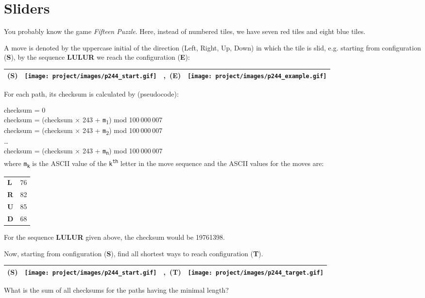 \section[Problem \#244: Sliders]{Sliders}
\label{sec:problem_244}

You probably know the game \emph{Fifteen Puzzle}. Here, instead of
numbered tiles, we have seven red tiles and eight blue tiles.

A move is denoted by the uppercase initial of the direction (Left,
Right, Up, Down) in which the tile is slid, e.g. starting from
configuration (\textbf{S}), by the sequence \textbf{LULUR} we reach the
configuration (\textbf{E}):

\begin{longtable}[]{@{}m{1cm}m{4cm}m{1cm}m{4cm}@{}}
\toprule
\endhead
(\textbf{S}) & \texttt{[image: project/images/p244\_start.gif]} &
,~(\textbf{E}) & \texttt{[image: project/images/p244\_example.gif]} \\
\bottomrule
\end{longtable}

For each path, its checksum is calculated by (pseudocode):

checksum = 0\\
checksum = (checksum × 243 + \texttt{m}\textsubscript{1}) mod
100 000 007\\
checksum = (checksum × 243 + \texttt{m}\textsubscript{2}) mod
100 000 007\\
\hspace*{0.333em}\hspace*{0.333em}\hspace*{0.333em}\ldots{}\\
checksum = (checksum × 243 + \texttt{m}\textsubscript{\texttt{n}}) mod
100 000 007\\

where \texttt{m}\textsubscript{\texttt{k}} is the ASCII value of the
\texttt{k}\textsuperscript{\texttt{th}} letter in the move sequence and
the ASCII values for the moves are:

\begin{longtable}[]{@{}ll@{}}
\toprule
\endhead
\textbf{L} & 76 \\
\textbf{R} & 82 \\
\textbf{U} & 85 \\
\textbf{D} & 68 \\
\bottomrule
\end{longtable}

For the sequence \textbf{LULUR} given above, the checksum would be
19761398.

Now, starting from configuration (\textbf{S}), find all shortest ways to
reach configuration (\textbf{T}).

\begin{longtable}[]{@{}m{1cm}m{4cm}m{1cm}m{4cm}@{}}
\toprule
\endhead
(\textbf{S}) & \texttt{[image: project/images/p244\_start.gif]} &
,~(\textbf{T}) & \texttt{[image: project/images/p244\_target.gif]} \\
\bottomrule
\end{longtable}

What is the sum of all checksums for the paths having the minimal
length?